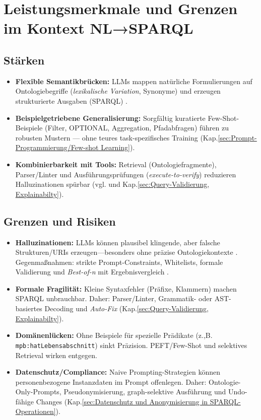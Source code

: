 \section{Leistungsmerkmale und Grenzen im Kontext NL→SPARQL}
\label{sec:LLM-Staerken-Grenzen}

\subsection{Stärken}
\begin{itemize}
\item \textbf{Flexible Semantikbrücken:} LLMs mappen natürliche Formulierungen auf Ontologiebegriffe (\emph{lexikalische Variation}, Synonyme) und erzeugen strukturierte Ausgaben (SPARQL) \cite{brown2020language}.
\item \textbf{Beispielgetriebene Generalisierung:} Sorgfältig kuratierte Few-Shot-Beispiele (Filter, OPTIONAL, Aggregation, Pfadabfragen) führen zu robusten Mustern — ohne teures task-spezifisches Training (Kap.\ref{sec:Prompt-Programmierung/Few-shot Learning}).
\item \textbf{Kombinierbarkeit mit Tools:} Retrieval (Ontologiefragmente), Parser/Linter und Ausführungsprüfungen (\emph{execute-to-verify}) reduzieren Halluzinationen spürbar (vgl. \cite{avila2024text2sparql} und Kap.\ref{sec:Query-Validierung, Explainabilty}).
\end{itemize}

\subsection{Grenzen und Risiken}
\begin{itemize}
\item \textbf{Halluzinationen:} LLMs können plausibel klingende, aber falsche Strukturen/URIs erzeugen—besonders ohne präzise Ontologiekontexte \cite{ji2023hallucination}. Gegenmaßnahmen: strikte Prompt-Constraints, Whitelists, formale Validierung und \emph{Best-of-n} mit Ergebnisvergleich \cite{avila2024text2sparql}.
\item \textbf{Formale Fragilität:} Kleine Syntaxfehler (Präfixe, Klammern) machen SPARQL unbrauchbar. Daher: Parser/Linter, Grammatik- oder AST-basiertes Decoding und \emph{Auto-Fix} (Kap.\ref{sec:Query-Validierung, Explainabilty}).
\item \textbf{Domänenlücken:} Ohne Beispiele für spezielle Prädikate (z.,B. \texttt{mpb:hatLebensabschnitt}) sinkt Präzision. PEFT/Few-Shot und selektives Retrieval wirken entgegen.
\item \textbf{Datenschutz/Compliance:} Naive Prompting-Strategien können personenbezogene Instanzdaten im Prompt offenlegen. Daher: Ontologie-Only-Prompts, Pseudonymisierung, graph-selektive Ausführung und Undo-fähige Changes (Kap.\ref{sec:Datenschutz und Anonymisierung in SPARQL-Operationen}).
\end{itemize}

